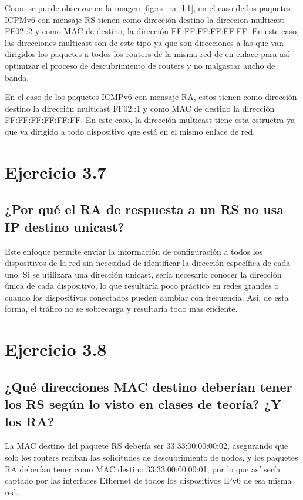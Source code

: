 Como se puede observar en la imagen \ref{fig:rs_ra_h1}, en el caso de los paquetes ICPMv6 con mensaje RS tienen como dirección destino la direccion multicast FF02::2 y como MAC de destino, la dirección FF:FF:FF:FF:FF:FF. En este caso, las direcciones multicast son de este tipo ya que son direcciones a las que van dirigidos los paquetes a todos los routers de la misma red de en enlace para así optimizar el proceso de descubrimiento de routers y no malgastar ancho de banda.

En el caso de los paquetes ICMPv6 con mensaje RA, estos tienen como dirección destino la dirección multicast FF02::1 y como MAC de destino la dirección FF:FF:FF:FF:FF:FF. En este caso, la dirección multicast tiene esta estructra ya que va dirigido a todo dispositivo que está en el mismo enlace de red. 

\section{Ejercicio 3.7}
\subsection{¿Por qué el RA de respuesta a un RS no usa IP destino unicast?}

Este enfoque permite enviar la información de configuración a todos los dispositivos de la red sin necesidad de identificar la dirección específica de cada uno. Si se utilizara una dirección unicast, sería necesario conocer la dirección única de cada dispositivo, lo que resultaría poco práctico en redes grandes o cuando los dispositivos conectados pueden cambiar con frecuencia. Así, de esta forma, el tráfico no se sobrecarga y resultaría todo mas eficiente.

\section{Ejercicio 3.8}
\subsection{¿Qué direcciones MAC destino deberían tener los RS según lo visto en clases de teoría? ¿Y los RA?}

La MAC destino del paquete RS debería ser 33:33:00:00:00:02, asegurando que solo los routers reciban las solicitudes de descubrimiento de nodos, y los paquetes RA deberían tener como MAC destino 33:33:00:00:00:01, por lo que así sería captado por las interfaces Ethernet de todos los dispositivos IPv6 de esa misma red.

